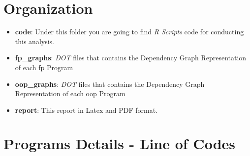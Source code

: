 \documentclass[12pt, a4paper]{article}
\begin{document}



\appendix
\section{Organization}\label{apx:sec:org:1}

\begin{itemize}
    \item \textbf{code}: Under this folder you are going to find \textit{R Scripts} code for conducting this analysis.
    \item \textbf{fp\_graphs}: \textit{DOT} files that contains the Dependency Graph Representation of each \acrlong{fp} Program
    \item \textbf{oop\_graphs}: \textit{DOT} files that contains the Dependency Graph Representation of each \acrlong{oop} Program
    \item \textbf{report}: This report in Latex and PDF format.
\end{itemize}

\section{Programs Details - Line of Codes}\label{apx:sec:loc}
\end{document}
